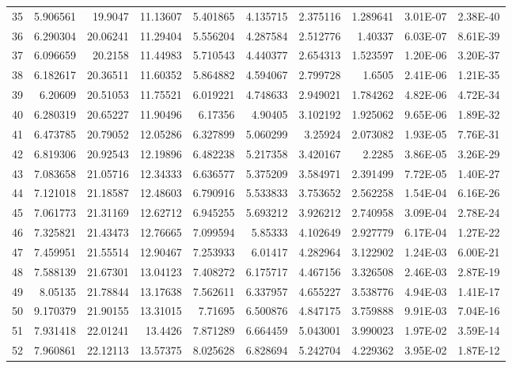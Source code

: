 \documentclass[a4paper]{article}
\begin{document}
{\begin{tabular}{|l|r|r|r|r|r|r|r|r|r|}
    {35} & 5.906561 & 19.9047 & 11.13607 & 5.401865 & 4.135715 & 2.375116 & 1.289641 & 3.01E-07 & 2.38E-40 \\
    {36} & 6.290304 & 20.06241 & 11.29404 & 5.556204 & 4.287584 & 2.512776 & 1.40337 & 6.03E-07 & 8.61E-39 \\
    {37} & 6.096659 & 20.2158 & 11.44983 & 5.710543 & 4.440377 & 2.654313 & 1.523597 & 1.20E-06 & 3.20E-37 \\
    {38} & 6.182617 & 20.36511 & 11.60352 & 5.864882 & 4.594067 & 2.799728 & 1.6505 & 2.41E-06 & 1.21E-35 \\
    {39} & 6.20609 & 20.51053 & 11.75521 & 6.019221 & 4.748633 & 2.949021 & 1.784262 & 4.82E-06 & 4.72E-34 \\
    {40} & 6.280319 & 20.65227 & 11.90496 & 6.17356 & 4.90405 & 3.102192 & 1.925062 & 9.65E-06 & 1.89E-32 \\
    {41} & 6.473785 & 20.79052 & 12.05286 & 6.327899 & 5.060299 & 3.25924 & 2.073082 & 1.93E-05 & 7.76E-31 \\
    {42} & 6.819306 & 20.92543 & 12.19896 & 6.482238 & 5.217358 & 3.420167 & 2.2285 & 3.86E-05 & 3.26E-29 \\
    {43} & 7.083658 & 21.05716 & 12.34333 & 6.636577 & 5.375209 & 3.584971 & 2.391499 & 7.72E-05 & 1.40E-27 \\
    {44} & 7.121018 & 21.18587 & 12.48603 & 6.790916 & 5.533833 & 3.753652 & 2.562258 & 1.54E-04 & 6.16E-26 \\
    {45} & 7.061773 & 21.31169 & 12.62712 & 6.945255 & 5.693212 & 3.926212 & 2.740958 & 3.09E-04 & 2.78E-24 \\
    {46} & 7.325821 & 21.43473 & 12.76665 & 7.099594 & 5.85333 & 4.102649 & 2.927779 & 6.17E-04 & 1.27E-22 \\
    {47} & 7.459951 & 21.55514 & 12.90467 & 7.253933 & 6.01417 & 4.282964 & 3.122902 & 1.24E-03 & 6.00E-21 \\
    {48} & 7.588139 & 21.67301 & 13.04123 & 7.408272 & 6.175717 & 4.467156 & 3.326508 & 2.46E-03 & 2.87E-19 \\
    {49} & 8.05135 & 21.78844 & 13.17638 & 7.562611 & 6.337957 & 4.655227 & 3.538776 & 4.94E-03 & 1.41E-17 \\
    {50} & 9.170379 & 21.90155 & 13.31015 & 7.71695 & 6.500876 & 4.847175 & 3.759888 & 9.91E-03 & 7.04E-16 \\
    {51} & 7.931418 & 22.01241 & 13.4426 & 7.871289 & 6.664459 & 5.043001 & 3.990023 & 1.97E-02 & 3.59E-14 \\
    {52} & 7.960861 & 22.12113 & 13.57375 & 8.025628 & 6.828694 & 5.242704 & 4.229362 & 3.95E-02 & 1.87E-12 \\

\end{tabular}}
\end{document}
